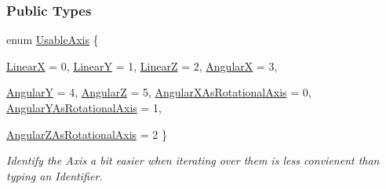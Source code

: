 \subsubsection*{Public Types}
\begin{DoxyCompactItemize}
\item 
enum \hyperlink{classMezzanine_1_1Generic6DofConstraint_ac00067026a7d4e7c6832f169c754d585}{UsableAxis} \{ \par
\hyperlink{classMezzanine_1_1Generic6DofConstraint_ac00067026a7d4e7c6832f169c754d585ae15486eb9682cca0467859b8e7b16d4c}{LinearX} =  0, 
\hyperlink{classMezzanine_1_1Generic6DofConstraint_ac00067026a7d4e7c6832f169c754d585a1f0fd3c6af820cebda8a5e634483b5a8}{LinearY} =  1, 
\hyperlink{classMezzanine_1_1Generic6DofConstraint_ac00067026a7d4e7c6832f169c754d585a7b164ae20f69440f5241bb3f0119aa9c}{LinearZ} =  2, 
\hyperlink{classMezzanine_1_1Generic6DofConstraint_ac00067026a7d4e7c6832f169c754d585a2ff1d26a1d5afa5d7d1221f1cf87253d}{AngularX} =  3, 
\par
\hyperlink{classMezzanine_1_1Generic6DofConstraint_ac00067026a7d4e7c6832f169c754d585ab93b7724c369714f3a3e628b3be7e908}{AngularY} =  4, 
\hyperlink{classMezzanine_1_1Generic6DofConstraint_ac00067026a7d4e7c6832f169c754d585a98514adda7c9a79e57504fa1b714cb1e}{AngularZ} =  5, 
\hyperlink{classMezzanine_1_1Generic6DofConstraint_ac00067026a7d4e7c6832f169c754d585a695178ce4fa859bda7160fa4578db91b}{AngularXAsRotationalAxis} =  0, 
\hyperlink{classMezzanine_1_1Generic6DofConstraint_ac00067026a7d4e7c6832f169c754d585a7a7c9ce64bdaa80d9dc387d3ef67b381}{AngularYAsRotationalAxis} =  1, 
\par
\hyperlink{classMezzanine_1_1Generic6DofConstraint_ac00067026a7d4e7c6832f169c754d585a3b1e471b3713fd2fbb3fb689dd4f39b4}{AngularZAsRotationalAxis} =  2
 \}
\begin{DoxyCompactList}\small\item\em Identify the Axis a bit easier when iterating over them is less convienent than typing an Identifier. \item\end{DoxyCompactList}\end{DoxyCompactItemize}
